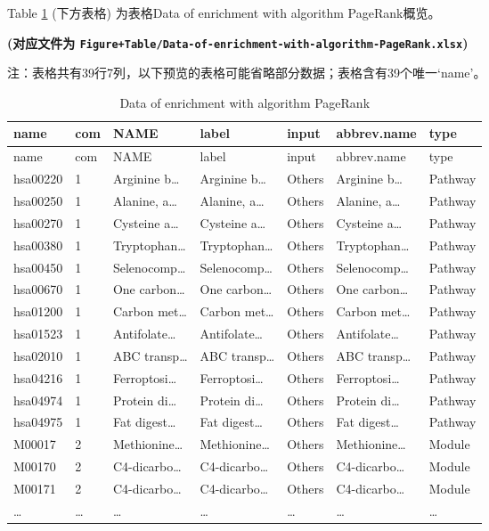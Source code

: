 \documentclass[
]{article}
\begin{document}
Table \ref{tab:Data-of-enrichment-with-algorithm-PageRank} (下方表格) 为表格Data of enrichment with algorithm PageRank概览。

\textbf{(对应文件为 \texttt{Figure+Table/Data-of-enrichment-with-algorithm-PageRank.xlsx})}

\begin{center}\begin{tcolorbox}[colback=gray!10, colframe=gray!50, width=0.9\linewidth, arc=1mm, boxrule=0.5pt]注：表格共有39行7列，以下预览的表格可能省略部分数据；表格含有39个唯一`name'。
\end{tcolorbox}
\end{center}

\begin{longtable}[]{@{}lllllll@{}}
\caption{\label{tab:Data-of-enrichment-with-algorithm-PageRank}Data of enrichment with algorithm PageRank}\tabularnewline
\toprule
name & com & NAME & label & input & abbrev.name & type\tabularnewline
\midrule
\endfirsthead
\toprule
name & com & NAME & label & input & abbrev.name & type\tabularnewline
\midrule
\endhead
hsa00220 & 1 & Arginine b\ldots{} & Arginine b\ldots{} & Others & Arginine b\ldots{} & Pathway\tabularnewline
hsa00250 & 1 & Alanine, a\ldots{} & Alanine, a\ldots{} & Others & Alanine, a\ldots{} & Pathway\tabularnewline
hsa00270 & 1 & Cysteine a\ldots{} & Cysteine a\ldots{} & Others & Cysteine a\ldots{} & Pathway\tabularnewline
hsa00380 & 1 & Tryptophan\ldots{} & Tryptophan\ldots{} & Others & Tryptophan\ldots{} & Pathway\tabularnewline
hsa00450 & 1 & Selenocomp\ldots{} & Selenocomp\ldots{} & Others & Selenocomp\ldots{} & Pathway\tabularnewline
hsa00670 & 1 & One carbon\ldots{} & One carbon\ldots{} & Others & One carbon\ldots{} & Pathway\tabularnewline
hsa01200 & 1 & Carbon met\ldots{} & Carbon met\ldots{} & Others & Carbon met\ldots{} & Pathway\tabularnewline
hsa01523 & 1 & Antifolate\ldots{} & Antifolate\ldots{} & Others & Antifolate\ldots{} & Pathway\tabularnewline
hsa02010 & 1 & ABC transp\ldots{} & ABC transp\ldots{} & Others & ABC transp\ldots{} & Pathway\tabularnewline
hsa04216 & 1 & Ferroptosi\ldots{} & Ferroptosi\ldots{} & Others & Ferroptosi\ldots{} & Pathway\tabularnewline
hsa04974 & 1 & Protein di\ldots{} & Protein di\ldots{} & Others & Protein di\ldots{} & Pathway\tabularnewline
hsa04975 & 1 & Fat digest\ldots{} & Fat digest\ldots{} & Others & Fat digest\ldots{} & Pathway\tabularnewline
M00017 & 2 & Methionine\ldots{} & Methionine\ldots{} & Others & Methionine\ldots{} & Module\tabularnewline
M00170 & 2 & C4-dicarbo\ldots{} & C4-dicarbo\ldots{} & Others & C4-dicarbo\ldots{} & Module\tabularnewline
M00171 & 2 & C4-dicarbo\ldots{} & C4-dicarbo\ldots{} & Others & C4-dicarbo\ldots{} & Module\tabularnewline
\ldots{} & \ldots{} & \ldots{} & \ldots{} & \ldots{} & \ldots{} & \ldots{}\tabularnewline
\bottomrule
\end{longtable}
\end{document}
